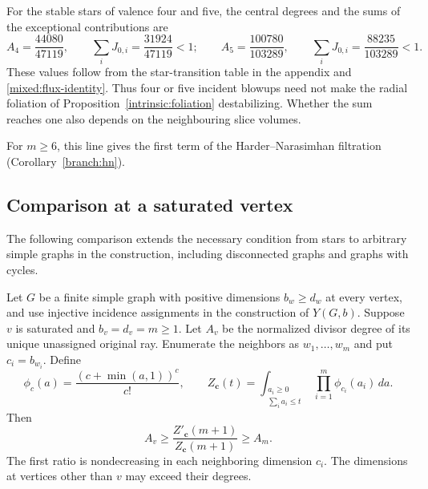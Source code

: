For the stable stars of valence four and five, the central degrees and
the sums of the exceptional contributions are
\[
 A_4=\frac{44080}{47119},\qquad
 \sum_iJ_{0,i}=\frac{31924}{47119}<1;
 \qquad
 A_5=\frac{100780}{103289},\qquad
 \sum_iJ_{0,i}=\frac{88235}{103289}<1.
\]
These values follow from the star-transition table in the appendix
and \eqref{mixed:flux-identity}.
Thus four or five incident blowups need not make the radial foliation
of Proposition~\ref{intrinsic:foliation} destabilizing. Whether the sum
reaches one also depends on the neighbouring slice volumes.

For $m\ge6$, this line gives the first term of the Harder--Narasimhan
filtration (Corollary~\ref{branch:hn}).

\subsection{Comparison at a saturated vertex}

The following comparison extends the necessary condition from stars to
arbitrary simple graphs in the construction, including disconnected
graphs and graphs with cycles.

\begin{theorem}\label{branch:comparison}
Let $G$ be a finite simple graph with positive dimensions $b_w\ge d_w$
at every vertex, and use injective incidence assignments in the
construction of $Y(G,b)$. Suppose $v$ is saturated and
$b_v=d_v=m\ge1$. Let $A_v$ be the normalized divisor degree of its unique
unassigned original ray. Enumerate the neighbors as $w_1,\ldots,w_m$
and put $c_i=b_{w_i}$. Define
\[
 \phi_c(a)=\frac{(c+\min(a,1))^c}{c!},\qquad
 Z_{\mathbf c}(t)=\int_{\substack{a_i\ge0\\\sum_i a_i\le t}}
                  \prod_{i=1}^m\phi_{c_i}(a_i)\,da.
\]
Then
\[
 A_v\ge\frac{Z'_{\mathbf c}(m+1)}{Z_{\mathbf c}(m+1)}
       \ge A_m.
\]
The first ratio is nondecreasing in each neighboring dimension $c_i$.
The dimensions at vertices other than $v$ may exceed their degrees.
\end{theorem}

